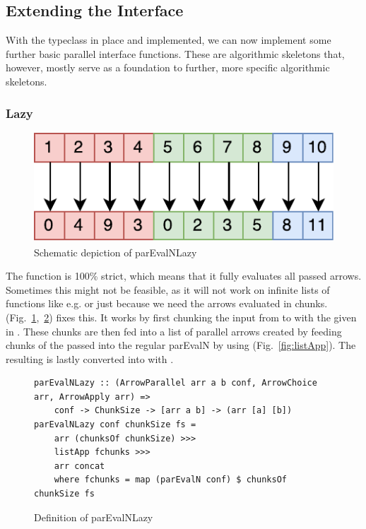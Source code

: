 \subsection{Extending the Interface}
\label{sec:extending-interface}
With the  typeclass in place and implemented, we can now implement some further basic parallel interface functions. These are algorithmic skeletons that, however, mostly serve as a foundation to further, more specific algorithmic skeletons.

\subsubsection{Lazy }
\begin{figure}[h]
	\includegraphics[scale=0.7]{images/parEvalNLazy}
	\caption{Schematic depiction of parEvalNLazy}
	\label{fig:parEvalNLazyImg}
\end{figure}
The function  is 100\% strict, which means that it fully evaluates all passed arrows. Sometimes this might not be feasible, as it will not work on infinite lists of functions like e.g.  or just because we need the arrows evaluated in chunks.  (Fig.~\ref{fig:parEvalNLazyImg},~\ref{fig:parEvalNLazy}) fixes this. It works by first chunking the input from \inlinecode{[a]} to \inlinecode{[[a]]} with the given  in . These chunks are then fed into a list \inlinecode{[arr [a] [b]]} of parallel arrows created by feeding chunks of the passed  into the regular parEvalN by using  (Fig.~\ref{fig:listApp}). The resulting \inlinecode{[[b]]} is lastly converted into \inlinecode{[b]} with .
\begin{figure}[h]
\begin{lstlisting}[frame=htrbl]
parEvalNLazy :: (ArrowParallel arr a b conf, ArrowChoice arr, ArrowApply arr) =>
	conf -> ChunkSize -> [arr a b] -> (arr [a] [b])
parEvalNLazy conf chunkSize fs =
	arr (chunksOf chunkSize) >>>
	listApp fchunks >>>
	arr concat
	where fchunks = map (parEvalN conf) $ chunksOf chunkSize fs
\end{lstlisting} %
\caption{Definition of parEvalNLazy}
\label{fig:parEvalNLazy}
\end{figure}

